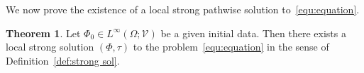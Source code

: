\documentclass[11pt, reqno]{amsart}
\theoremstyle{definition}
\newtheorem{theorem}{Theorem}[section]
\numberwithin{equation}{section}
\newcommand{\bb}{\mathbb}
\newcommand{\dt}{\mathrm{d}t}
\newcommand{\norm}[1]{\left\|{#1}\right\|}
\newcommand{\abs}[1]{\left|{#1}\right|}
\begin{document}

We now prove the existence of a local strong pathwise solution to~\eqref{equ:equation}.

\begin{theorem}\label{the:strong sol}
Let $\Phi_0\in L^\infty(\Omega;\mathcal{V})$ be a given initial data. Then there exists a local strong solution $(\Phi,\tau)$ to the problem~\eqref{equ:equation} in the sense of Definition~\eqref{def:strong sol}.
\end{theorem}
\end{document}

